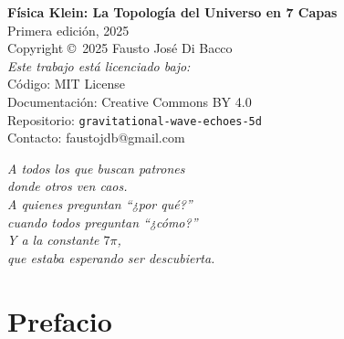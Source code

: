 \documentclass[12pt,a4paper,openany]{book}
\begin{document}
\thispagestyle{empty}
\vspace*{\fill}
\begin{center}
    \textbf{Física Klein: La Topología del Universo en 7 Capas}\\[0.5cm]
    Primera edición, 2025\\[1cm]

    Copyright \copyright\ 2025 Fausto José Di Bacco\\[0.5cm]

    \textit{Este trabajo está licenciado bajo:}\\
    Código: MIT License\\
    Documentación: Creative Commons BY 4.0\\[1cm]

    Repositorio: \texttt{gravitational-wave-echoes-5d}\\
    Contacto: faustojdb@gmail.com
\end{center}
\vspace*{\fill}
\newpage

\thispagestyle{empty}
\vspace*{3cm}
\begin{flushright}
    \textit{A todos los que buscan patrones\\
    donde otros ven caos.\\[0.5cm]
    A quienes preguntan ``¿por qué?''\\
    cuando todos preguntan ``¿cómo?''\\[0.5cm]
    Y a la constante $7\pi$,\\
    que estaba esperando ser descubierta.}
\end{flushright}
\vspace*{\fill}
\newpage

\tableofcontents

\chapter*{Prefacio}
\end{document}
